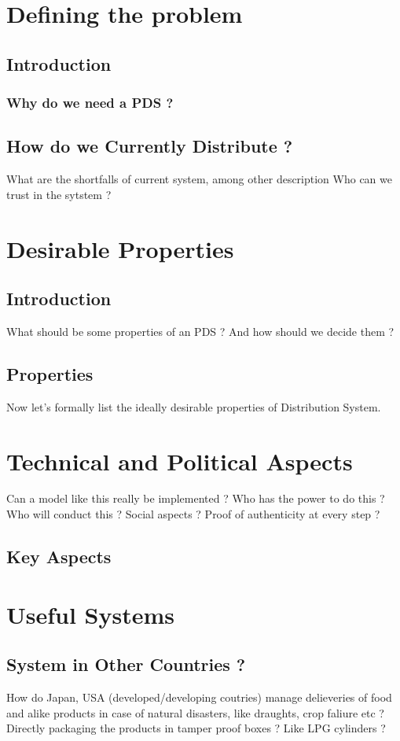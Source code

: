 \documentclass[12pt]{report}
\begin{document}
\chapter{Defining the problem}
\section{Introduction}
\subsection{Why do we need a PDS ?}
\section{How do we Currently Distribute ?}
What are the shortfalls of current system, among other description
Who can we trust in the sytstem ?


\chapter{Desirable Properties}
\section{Introduction}
What should be some properties of an PDS ? And how should we decide them ?
\section{Properties}
Now let's formally list the ideally desirable properties of Distribution System.

\chapter{Technical and Political Aspects}
Can a model like this really be implemented ? Who has the power to do this ? Who will conduct this ?
Social aspects ? Proof of authenticity at every step ?
\section{Key Aspects}

\chapter{Useful Systems}
\section{System in Other Countries ?}
How do Japan, USA (developed/developing coutries) manage delieveries of food and alike products in case of natural disasters, like draughts, crop faliure etc ?
\\
Directly packaging the products in tamper proof boxes ? Like LPG cylinders ? 
\end{document}

